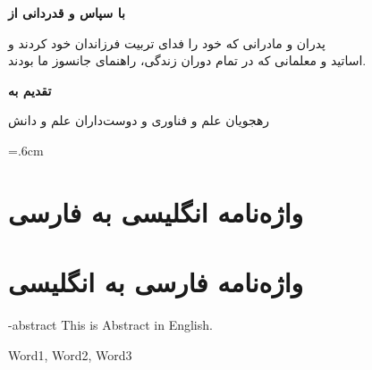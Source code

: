 \documentclass[oneside,openany,mscS]{SBU-Thesis}
\begin{document}
	
\firstPage %
\davaranPage %

{
	\newpage
	\thispagestyle{plain}
	\noindent
	\large{\textbf{با سپاس و قدردانی از}}
	
	\noindent
	پدران و مادرانی که خود را فدای تربیت فرزاندان خود کردند و\\
	اساتید و معلمانی که در تمام دوران زندگی، راهنمای جانسوز ما بودند.
	
	
	\vspace{14cm}	
	
	
	\pagebreak
}

\rightsPage %
\copyRightPage %

{
	\newpage
	\thispagestyle{plain}
	\large{\textbf{تقدیم به}}
	
	\begin{center}
		رهجويان علم و فناوری و دوست‌داران علم و دانش
	\end{center}
	
	\vspace{14cm}	
	
	
	\pagebreak
}
\tableofcontents %
\listoffigures \newpage %
\listoftables \newpage %

	
\abstractPage %
		




	

\newpage



\baselineskip=.6cm

\chapter*{واژه‌نامه  انگلیسی به  فارسی}
\noindent
{}


\chapter*{واژه‌نامه فارسی به انگلیسی}
\noindent
{}

\baselineskip=1cm


\en-abstract
{
	This is Abstract in English.
}

\latinkeywords
{
	Word1, Word2, Word3
}

\latinAbstractPage %
\latinFirstPage %

	
\end{document}
